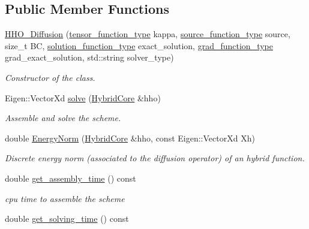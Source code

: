 \subsection*{Public Member Functions}
\begin{DoxyCompactItemize}
\item 
\hyperlink{group__HHO__Diffusion_gab9aebbde87e22073a94a57e26f58a860}{H\+H\+O\+\_\+\+Diffusion} (\hyperlink{classHArDCore3D_1_1HHO__Diffusion_a6792ca91d753720b28f458bdb3cedcd0}{tensor\+\_\+function\+\_\+type} kappa, \hyperlink{classHArDCore3D_1_1HHO__Diffusion_a868fb4b88efbf1b77a712706d616b8d1}{source\+\_\+function\+\_\+type} source, size\+\_\+t BC, \hyperlink{classHArDCore3D_1_1HHO__Diffusion_a1fa6e03a7ffd6cb0c8a38b34eda2bd27}{solution\+\_\+function\+\_\+type} exact\+\_\+solution, \hyperlink{classHArDCore3D_1_1HHO__Diffusion_afd0b6d7ab35bca58a5f7ec29afbba355}{grad\+\_\+function\+\_\+type} grad\+\_\+exact\+\_\+solution, std\+::string solver\+\_\+type)
\begin{DoxyCompactList}\small\item\em Constructor of the class. \end{DoxyCompactList}\item 
Eigen\+::\+Vector\+Xd \hyperlink{group__HHO__Diffusion_gac2ab416e340edc055d1494f5dbe9acce}{solve} (\hyperlink{classHArDCore3D_1_1HybridCore}{Hybrid\+Core} \&hho)
\begin{DoxyCompactList}\small\item\em Assemble and solve the scheme. \end{DoxyCompactList}\item 
double \hyperlink{group__HHO__Diffusion_ga65f1cf98696c042edefb2f35d298b971}{Energy\+Norm} (\hyperlink{classHArDCore3D_1_1HybridCore}{Hybrid\+Core} \&hho, const Eigen\+::\+Vector\+Xd Xh)
\begin{DoxyCompactList}\small\item\em Discrete energy norm (associated to the diffusion operator) of an hybrid function. \end{DoxyCompactList}\item 
double \hyperlink{group__HHO__Diffusion_gaa2bb4d069026f1604d2899031d3642f1}{get\+\_\+assembly\+\_\+time} () const
\begin{DoxyCompactList}\small\item\em cpu time to assemble the scheme \end{DoxyCompactList}\item 
double \hyperlink{group__HHO__Diffusion_gadcad4a2ddc4f767a5cc59362c93adbc2}{get\+\_\+solving\+\_\+time} () const

\end{DoxyCompactItemize}
